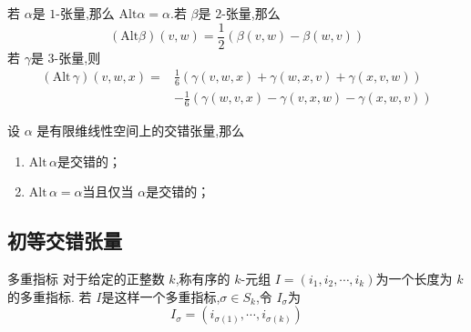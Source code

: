 \documentclass[../../几何与拓扑.tex]{subfiles}
\begin{document}
\begin{example}若 $ \alpha $是 $ 1 $-张量,那么 $ \mathrm{Alt}\alpha=\alpha $.若 $ \beta $是 $ 2 $-张量,那么
     $$
     \left( \mathrm{Alt}\beta \right)\left( v,w \right)= \frac{1}{2}\left( \beta\left( v,w \right)-\beta\left( w,v \right)   \right)   
     $$     
     若 $ \gamma $是 $ 3 $-张量,则 $$
\begin{aligned}
    \left( \mathrm{Alt}\,\gamma \right)\left( v,w,x \right)= &\frac{1}{6}\left( \gamma\left( v,w,x \right)+ \gamma\left( w,x,v \right)+\gamma\left( x,v,w \right)     \right)\\ 
      & -\frac{1}{6}\left( \gamma\left( w,v,x \right)-\gamma\left( v,x,w \right)-\gamma\left( x,w,v \right)    \right) 
\end{aligned}   
     $$  
 
\end{example}

\begin{proposition}
    设 $ \alpha $ 是有限维线性空间上的交错张量,那么
    \begin{enumerate}
        \item $ \mathrm{Alt}\,\alpha $是交错的；
        \item $ \mathrm{Alt}\,\alpha=\alpha $当且仅当 $ \alpha $是交错的；   
    \end{enumerate}
    
    
\end{proposition}

\subsection{初等交错张量}

\begin{definition}{多重指标}
    对于给定的正整数 $ k $,称有序的 $ k $-元组 $ I = \left( i_1,i_2,\cdots,i_k \right)  $为一个长度为 $ k $的多重指标.
    若 $ I $是这样一个多重指标,$ \sigma \in S_{k} $,令 $ I_{\sigma} $为 $$
    I_{\sigma}= \left( i_{\sigma\left( 1 \right) },\cdots ,i_{\sigma\left( k \right) } \right) 
    $$      
\end{definition}
\end{document}
